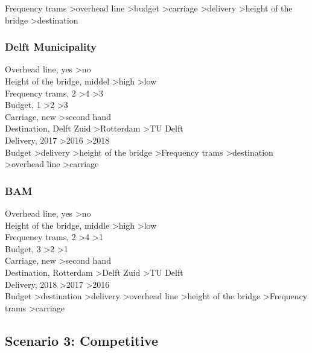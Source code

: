 \documentclass{article}
\begin{document}
Frequency trams \textgreater overhead line \textgreater budget \textgreater carriage \textgreater delivery \textgreater height of the bridge \textgreater destination \\

\subsubsection*{Delft Municipality}
Overhead line, yes \textgreater no\\
Height of the bridge, middel \textgreater high \textgreater low \\
Frequency trams, 2 \textgreater 4 \textgreater 3 \\
Budget, 1 \textgreater 2 \textgreater 3\\
Carriage, new \textgreater second hand\\
Destination, Delft Zuid \textgreater Rotterdam \textgreater TU Delft\\
Delivery, 2017 \textgreater 2016 \textgreater 2018\\

Budget \textgreater delivery \textgreater height of the bridge \textgreater Frequency trams \textgreater destination \textgreater overhead line \textgreater carriage\\

\subsubsection*{BAM}
Overhead line, yes \textgreater no\\
Height of the bridge, middle \textgreater high \textgreater low\\
Frequency trams, 2 \textgreater 4 \textgreater 1\\
Budget, 3 \textgreater 2 \textgreater 1\\
Carriage, new \textgreater second hand\\
Destination, Rotterdam \textgreater Delft Zuid \textgreater TU Delft\\
Delivery, 2018 \textgreater 2017 \textgreater 2016 \\

Budget \textgreater destination \textgreater delivery \textgreater overhead line \textgreater height of the bridge \textgreater Frequency trams \textgreater carriage\\

\subsection{Scenario 3: Competitive}
\end{document}
